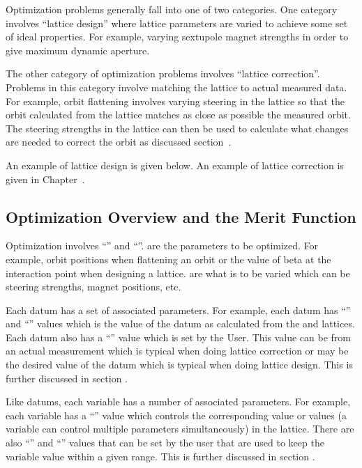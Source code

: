 \documentclass{hitec}     %
\begin{document}
Optimization problems generally fall into one of two categories. One category involves ``lattice
design'' where lattice parameters are varied to achieve some set of ideal properties. For example,
varying sextupole magnet strengths in order to give maximum dynamic aperture.

The other category of optimization problems involves ``lattice correction''. Problems in this
category involve matching the  lattice to actual measured data.  For example, orbit
flattening involves varying steering in the  lattice so that the orbit calculated from the
 lattice matches as close as possible the measured orbit. The steering strengths in the
 lattice can then be used to calculate what changes are needed to correct the orbit
as discussed section~. 

An example of lattice design is given below. An example of lattice correction is given in
Chapter~.

\subsection{Optimization Overview and the Merit Function}
\label{s:opt.overview}

Optimization involves ``'' and ``''.  are the parameters to be
optimized.  For example, orbit positions when flattening an orbit or the value of beta at the
interaction point when designing a lattice.  are what is to be varied which can be
steering strengths, magnet positions, etc. 

Each datum has a set of associated parameters. For example, each datum has ``'' and
``'' values which is the value of the datum as calculated from the  and
 lattices. Each datum also has a ``'' value which is set by the User. This
value can be from an actual measurement which is typical when doing lattice correction or may be the
desired value of the datum which is typical when doing lattice design. This is further discussed in
section . 

Like datums, each variable has a number of associated parameters. For example, each variable has a
``'' value which controls the corresponding value or values (a variable can control
multiple parameters simultaneously) in the  lattice. There are also ``'' and
``'' values that can be set by the user that are used to keep the variable 
value within a given range. This is further discussed in section .
\end{document}

